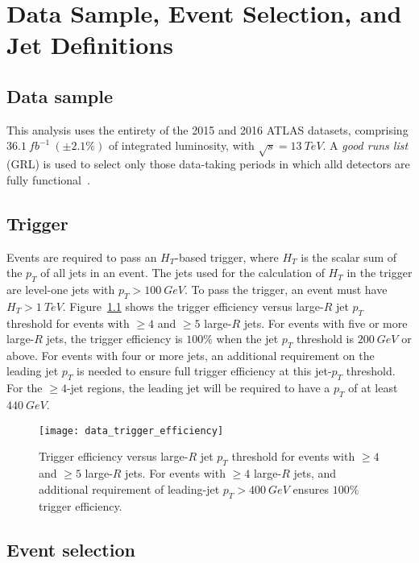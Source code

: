 \chapter{Data Sample, Event Selection, and Jet Definitions}\label{ch:data_and_event_selection}

\section{Data sample}\label{sec:data}
This analysis uses the entirety of the 2015 and 2016 ATLAS datasets, comprising \linebreak $36.1~fb^{-1}~(\pm2.1\%)$ of integrated luminosity, with $\sqrt{s}=13~TeV$.
A \textit{good runs list} (GRL) is used to select only those data-taking periods in which alld detectors are fully functional~\cite{data-grl}.

\section{Trigger}\label{sec:trigger}
Events are required to pass an $H_{T}$-based trigger, where $H_{T}$ is the scalar sum of the $p_{T}$ of all jets in an event.
The jets used for the calculation of $H_{T}$ in the trigger are level-one jets with $p_{T}>100~GeV$.
To pass the trigger, an event must have $H_{T}>1~TeV$.
Figure~\ref{fig:trigger_efficiency} shows the trigger efficiency versus large-$R$ jet $p_{T}$ threshold for events with $\geq4$ and $\geq5$ large-$R$ jets.
For events with five or more large-$R$ jets, the trigger efficiency is $100\%$ when the jet $p_{T}$ threshold is $200~GeV$ or above.
For events with four or more jets, an additional requirement on the leading jet $p_{T}$ is needed to ensure full trigger efficiency at this jet-$p_{T}$ threshold.
For the $\geq4$-jet regions, the leading jet will be required to have a $p_{T}$ of at least $440~GeV$.

\begin{figure}[!ht]
    \centering
    \texttt{[image: data\_trigger\_efficiency]}
    \caption{Trigger efficiency versus large-$R$ jet $p_{T}$ threshold for events with $\geq4$ and $\geq5$ large-$R$ jets.
    For events with $\geq4$ large-$R$ jets, and additional requirement of leading-jet $p_{T}>400~GeV$ ensures $100\%$ trigger efficiency.
    }
    \label{fig:trigger_efficiency}
\end{figure}

\section{Event selection}\label{sec:event_selection}

